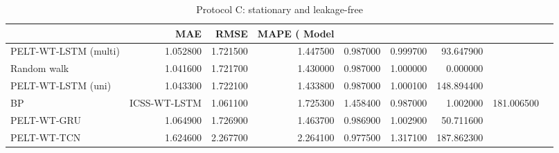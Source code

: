 \begin{table}[htbp]
\caption{Protocol C: stationary and leakage-free}
\label{tab:C_causal}
\begin{tabular}{lrrrrrr}
\toprule
 & MAE & RMSE & MAPE (%
Model &  &  &  &  &  &  \\
\midrule
PELT-WT-LSTM (multi) & 1.052800 & 1.721500 & 1.447500 & 0.987000 & 0.999700 & 93.647900 \\
Random walk & 1.041600 & 1.721700 & 1.430000 & 0.987000 & 1.000000 & 0.000000 \\
PELT-WT-LSTM (uni) & 1.043300 & 1.722100 & 1.433800 & 0.987000 & 1.000100 & 148.894400 \\
BP&ICSS-WT-LSTM & 1.061100 & 1.725300 & 1.458400 & 0.987000 & 1.002000 & 181.006500 \\
PELT-WT-GRU & 1.064900 & 1.726900 & 1.463700 & 0.986900 & 1.002900 & 50.711600 \\
PELT-WT-TCN & 1.624600 & 2.267700 & 2.264100 & 0.977500 & 1.317100 & 187.862300 \\
\bottomrule
\end{tabular}
\end{table}
